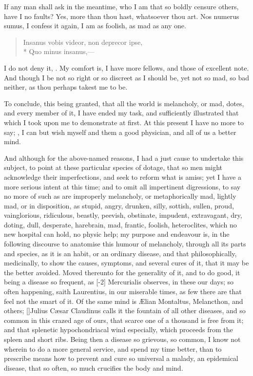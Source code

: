 If any man shall ask in the meantime, who I am that so boldly censure
others,  have I no faults? Yes, more than
thou hast, whatsoever thou art. Nos numerus sumus, I confess it again,
I am as foolish, as mad as any one.
%
\begin{verse}
\textlatin{Insanus vobis videor, non deprecor ipse,}\\*
\textlatin{Quo minus insanus,}---
\end{verse}

I do not deny it, . My comfort is, I have more
fellows, and those of excellent note. And though I be not so right or
so discreet as I should be, yet not so mad, so bad neither, as thou
perhaps takest me to be.

To conclude, this being granted, that all the world is melancholy, or
mad, dotes, and every member of it, I have ended my task, and
sufficiently illustrated that which I took upon me to demonstrate at
first. At this present I have no more to say; , I can but wish myself and them a good physician, and all of
us a better mind.

And although for the above-named reasons, I had a just cause to
undertake this subject, to point at these particular species of dotage,
that so men might acknowledge their imperfections, and seek to reform
what is amiss; yet I have a more serious intent at this time; and to
omit all impertinent digressions, to say no more of such as are
improperly melancholy, or metaphorically mad, lightly mad, or in
disposition, as stupid, angry, drunken, silly, sottish, sullen, proud,
vainglorious, ridiculous, beastly, peevish, obstinate, impudent,
extravagant, dry, doting, dull, desperate, harebrain, \etc{} mad, frantic,
foolish, heteroclites, which no new  hospital can hold, no physic
help; my purpose and endeavour is, in the following discourse to
anatomise this humour of melancholy, through all its parts and species,
as it is an habit, or an ordinary disease, and that philosophically,
medicinally, to show the causes, symptoms, and several cures of it,
that it may be the better avoided. Moved thereunto for the generality
of it, and to do good, it being a disease so frequent, as [-2\baselineskip]
Mercurialis observes, in these our days; so often happening, saith
 Laurentius, in our miserable times, as few there are that feel
not the smart of it. Of the same mind is \AE{}lian Montaltus,
Melancthon, and others; [\baselineskip]Julius C\ae{}sar Claudinus calls it the
fountain of all other diseases, and so common in this crazed age of
ours, that scarce one of a thousand is free from it; and that splenetic
hypochondriacal wind especially, which proceeds from the spleen and
short ribs. Being then a disease so grievous, so common, I know not
wherein to do a more general service, and spend my time better, than to
prescribe means how to prevent and cure so universal a malady, an
epidemical disease, that so often, so much crucifies the body and mind.

